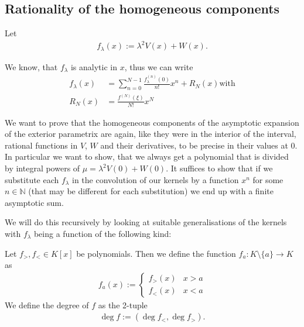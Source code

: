 \subsection{Rationality of the homogeneous components}
Let
\begin{align*}
	f_\lambda(x) := \lambda^2 V(x) + W(x).
\end{align*}

We know, that $f_\lambda$ is analytic in $x$, thus we can write
\begin{align*}
  f_\lambda(x) &= \sum_{n=0}^{N-1} \frac{f_\lambda^{(n)}(0)}{n!} x^n + R_N(x) \text{
  with} \\
  R_N(x) &= \frac{f^{(N)}(\xi)}{N!} x^{N}
\end{align*}

We want to prove that the homogeneous components of the asymptotic expansion of
the exterior parametrix are again, like they were in the interior of the
interval, rational functions in $V$, $W$ and their derivatives, to be precise in
their values at 0. In particular we want to show, that we always get a
polynomial that is divided by integral powers of $\mu = \lambda^2 V(0) + W(0)$.
It suffices to show that if we substitute each $f_\lambda$ in the convolution of
our kernels by a function $x^{n}$ for some $n\in\mathbb{N}$ (that may be
different for each substitution) we end up with a finite asymptotic sum.

We will do this recursively by looking at suitable generalisations of the
kernels with $f_\lambda$ being a function of the following kind:
\begin{Definition}
  Let $f_>, f_<\in K[x]$ be polynomials. Then we define the function $f_a\colon
  K\setminus\{a\}\to K$ as 
  \begin{align*}
    f_a(x) := \begin{cases}
      f_>(x) & x > a \\
      f_<(x) & x < a
    \end{cases}
  \end{align*}
  We define the degree of $f$ as the 2-tuple
  \begin{align*}
    \deg f := \left(\deg f_<, \deg f_>\right).
  \end{align*}
\end{Definition}

